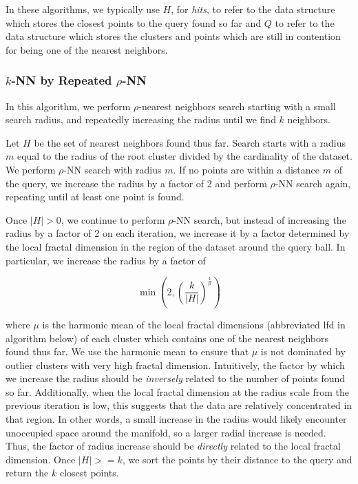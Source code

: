 In these algorithms, we typically use $H$, for \emph{hits}, to refer to the data structure which stores the closest points to the query found so far and
$Q$ to refer to the data structure which stores the clusters and points which are still in contention for being one of the nearest neighbors.


\subsubsection{\texorpdfstring{$k$}{k}-NN by Repeated \texorpdfstring{$\rho$}{p}-NN}
\label{subsubsec:methods:knn-search:repeated-rnn}

In this algorithm, we perform $\rho$-nearest neighbors search starting with a small search radius, and repeatedly increasing the radius until we find $k$ neighbors.

Let $H$ be the set of nearest neighbors found thus far.
Search starts with a radius $m$ equal to the radius of the root cluster divided by the cardinality of the dataset.
We perform $\rho$-NN search with radius $m$. 
If no points are within a distance $m$ of the query, we increase the radius by a factor of 2 and perform $\rho$-NN search again, repeating until at least one point is found.

Once $|H| > 0$, we continue to perform $\rho$-NN search, but instead of increasing the radius by a factor of 2 on each iteration, we increase it by a factor determined by the local fractal dimension in the region of the dataset around the query ball. 
In particular, we increase the radius by a factor of

\begin{equation}
    \min \left(2, \left({\frac{k}{|H|}}\right)^{\frac{1}{\mu}}\right)
    \label{eq:repeated-rnn-factor}
\end{equation}

where $\mu$ is the harmonic mean of the local fractal dimensions (abbreviated lfd in algorithm below) of each cluster which contains one of the nearest neighbors found thus far.
We use the harmonic mean to ensure that $\mu$ is not dominated by outlier clusters with very high fractal dimension. 
Intuitively, the factor by which we increase the radius should be \emph{inversely} related to the number of points found so far. 
Additionally, when the local fractal dimension at the radius scale from the previous iteration is low, this suggests that the data are relatively concentrated in that region.
In other words, a small increase in the radius would likely encounter unoccupied space around the manifold, so a larger radial increase is needed.
Thus, the factor of radius increase should be \emph{directly} related to the local fractal dimension.
Once $|H| >= k$, we sort the points by their distance to the query and return the $k$ closest points.

